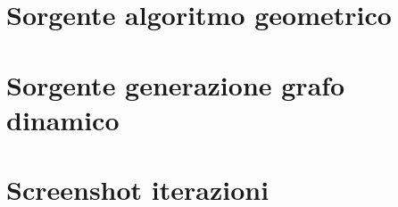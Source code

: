 \section{Sorgente algoritmo geometrico}
	
\section{Sorgente generazione grafo dinamico}
	
\section{Screenshot iterazioni}
	